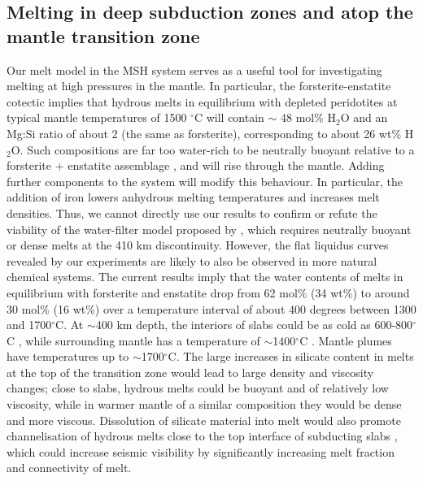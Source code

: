 \documentclass[review]{elsarticle}
\begin{document}
\subsection{Melting in deep subduction zones and atop the mantle transition zone}
Our melt model in the MSH system serves as a useful tool for investigating melting at high pressures in the mantle. In particular, the forsterite-enstatite cotectic implies that hydrous melts in equilibrium with depleted peridotites at typical mantle temperatures of 1500 $^{\circ}$C will contain $\sim$ 48 mol\% H$_2$O and an Mg:Si ratio of about 2 (the same as forsterite), corresponding to about 26 wt\% H$_2$O. Such compositions are far too water-rich to be neutrally buoyant relative to a forsterite + enstatite assemblage \citep{MSK2008}, and will rise through the mantle. Adding further components to the system will modify this behaviour. In particular, the addition of iron lowers anhydrous melting temperatures and increases melt densities. Thus, we cannot directly use our results to confirm or refute the viability of the water-filter model proposed by \cite{BK2003}, which requires neutrally buoyant or dense melts at the 410 km discontinuity. However, the flat liquidus curves revealed by our experiments are likely to also be observed in more natural chemical systems. The current results imply that the water contents of melts in equilibrium with forsterite and enstatite drop from 62 mol\% (34 wt\%) to around 30 mol\% (16 wt\%) over a temperature interval of about 400 degrees between 1300 and 1700$^{\circ}$C. At $\sim$400 km depth, the interiors of slabs could be as cold as 600-800$^{\circ}$C \citep{Frohlich2006}, while surrounding mantle has a temperature of $\sim$1400$^{\circ}$C \citep{Anderson1982}. Mantle plumes have temperatures up to $\sim$1700$^{\circ}$C. The large increases in silicate content in melts at the top of the transition zone would lead to large density and viscosity changes; close to slabs, hydrous melts could be buoyant and of relatively low viscosity, while in warmer mantle of a similar composition they would be dense and more viscous. Dissolution of silicate material into melt would also promote channelisation of hydrous melts close to the top interface of subducting slabs \citep{SKA2001,WK2012}, which could increase seismic visibility by significantly increasing melt fraction and connectivity of melt.



\end{document}
